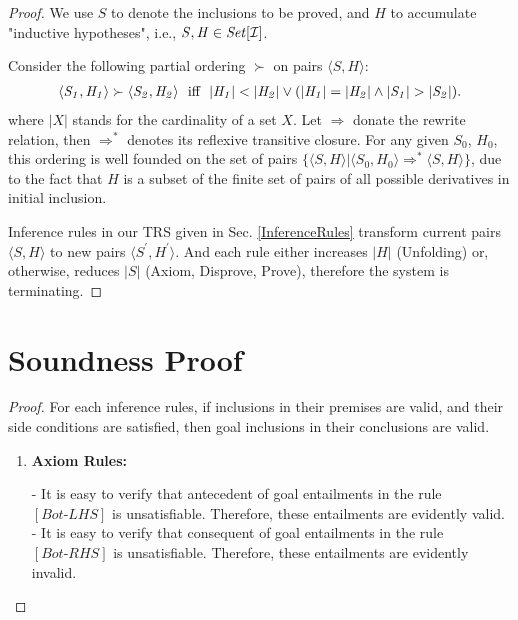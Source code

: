 \documentclass[acmsmall,10pt,review]{acmart}
\newcommand{\code}[1]{{\tt{\ensuremath{\m{#1}}}}}
\newcommand{\codeme}[1]{{\tt{\ensuremath{#1}}}}
\newcommand{\m}{\mathit}
\newcommand{\inclusion}{\code{\mathcal{I}}}
\newcommand\secref[1]{Sec. \textcolor{black}{\ref{#1}}}
\begin{document}
{{{\begin{proof}
We use \code{S} to denote the inclusions to be proved, and \code{H} to accumulate  "inductive hypotheses", i.e., \code{S,  H \in Set[\inclusion]}.

Consider the following partial ordering \code{\succ} on pairs \code{\langle S, H \rangle}:
\begin{gather*}
\code{\langle S_1, H_1 \rangle \succ \langle S_2, H_2 \rangle}\ \ \text{iff}\ \ \code{|H_1| < |H_2| \vee 
(|H_1| = |H_2| \wedge |S_1| > |S_2|)}. 
\end{gather*}
where \code{|X|} stands for the cardinality of a set \code{X}.  Let \code{\Rightarrow} donate the rewrite relation, then \code{\Rightarrow^*} denotes its reflexive transitive closure. For any given \code{S_0}, \code{H_0}, this ordering is well founded on the set of pairs \code{\{\langle S, H \rangle | \langle S_0, H_0 \rangle \Rightarrow^* \langle S, H \rangle \}}, due to the fact that \code{H} is a subset of the finite set of pairs of all possible derivatives in initial inclusion.


Inference rules in our TRS given in \secref{InferenceRules} transform current pairs \code{\langle S, H \rangle} to new pairs \code{\langle S^\prime, H^\prime \rangle}. 
And each rule either increases \code{|H|} (Unfolding) or, otherwise, reduces \code{|S|} (Axiom, Disprove, Prove), therefore the system is terminating.




 \end{proof}


\section{Soundness Proof} 
 \label{proof:SoundnessProof}
 

 

\begin{proof}
  For each inference rules, if inclusions in their premises are valid, and their side conditions are satisfied, then goal inclusions in their conclusions are valid.
  
  \begin{enumerate}
  \item \textbf{Axiom Rules:} 
  
  - It is easy to verify that antecedent of goal entailments in the rule \codeme{[Bot\text{-}LHS]} is unsatisfiable. Therefore, these entailments are evidently valid.\\
  - It is easy to verify that consequent of goal entailments in the rule \codeme{[Bot\text{-}RHS]} is unsatisfiable. Therefore, these entailments are evidently invalid.\\
  

\end{enumerate}
\end{proof}}}}
\end{document}
